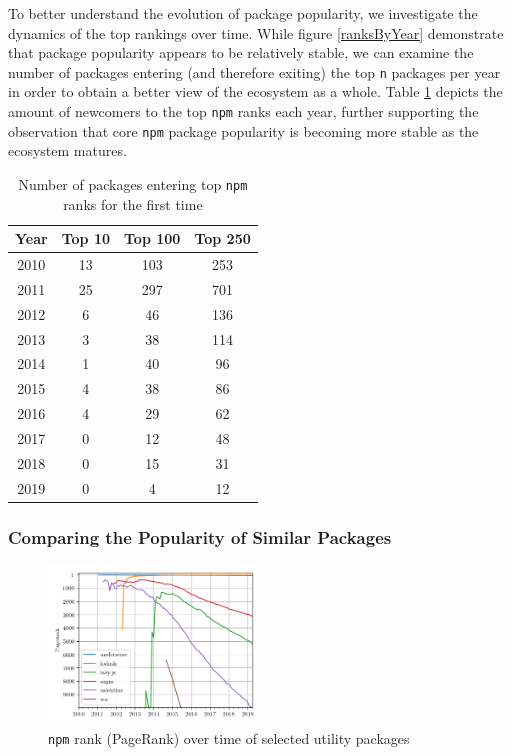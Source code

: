 \documentclass[10pt,conference]{IEEEtran}
\def\code#1{\texttt{#1}}
\begin{document}
To better understand the evolution of package popularity,
we investigate the dynamics of the top rankings over time.
While figure \ref{ranksByYear} demonstrate that package popularity
appears to be relatively stable, we can examine the number of packages
entering (and therefore exiting) the top \code{n} packages per year in
order to obtain a better view of the ecosystem as a whole.
Table \ref{numEnteringTop} depicts the amount of newcomers to the top
\code{npm} ranks each year, further supporting the observation that
core \code{npm} package popularity is becoming more stable as the 
ecosystem matures.

\begin{table}
  \centering
  \begin{tabular}{c|c|c|c}
    Year & Top 10 & Top 100 & Top 250 \\
    \hline
    2010 & 13 & 103 & 253\\
    2011 & 25 & 297 & 701\\
    2012 & 6 & 46 & 136\\
    2013 & 3 & 38 & 114\\
    2014 & 1 & 40 & 96\\
    2015 & 4 & 38 & 86\\
    2016 & 4 & 29 & 62\\
    2017 & 0 & 12 & 48\\
    2018 & 0 & 15 & 31\\
    2019 & 0 & 4 & 12\\
  \end{tabular}
  \caption{Number of packages entering top \code{npm} ranks for the first time}
  \label{numEnteringTop}
\end{table}



\subsubsection{Comparing the Popularity of Similar Packages}

\begin{figure}
  \includegraphics[width=0.5\textwidth]{figures/select_packages.png}
  \caption{\code{npm} rank (PageRank) over time of selected utility packages}
  \label{selectPackages}
\end{figure}
\end{document}

